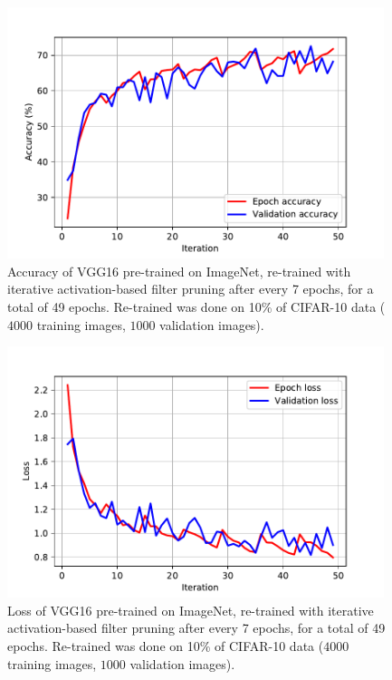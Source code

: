 \documentclass{article}
\begin{document}
\begin{figure}[!t]
	\centering
	\includegraphics[width=11cm]{./results/pPruneActNoNorm5_pre_out_7_in_7_cifar10_10percent_acc.pdf}
	\caption{Accuracy of VGG16 pre-trained on ImageNet, re-trained with iterative activation-based filter pruning after every 7 epochs, for a total of 49 epochs. Re-trained was done on 10\% of CIFAR-10 data ($4000$ training images, $1000$ validation images).}
\end{figure}

\begin{figure}[!t]
	\centering
	\includegraphics[width=11cm]{./results/pPruneActNoNorm5_pre_out_7_in_7_cifar10_10percent_loss.pdf}
	\caption{Loss of VGG16 pre-trained on ImageNet, re-trained with iterative activation-based filter pruning after every 7 epochs, for a total of 49 epochs. Re-trained was done on 10\% of CIFAR-10 data ($4000$ training images, $1000$ validation images).}
\end{figure}



\ \\ 
\ \\
\ \\
\end{document}
